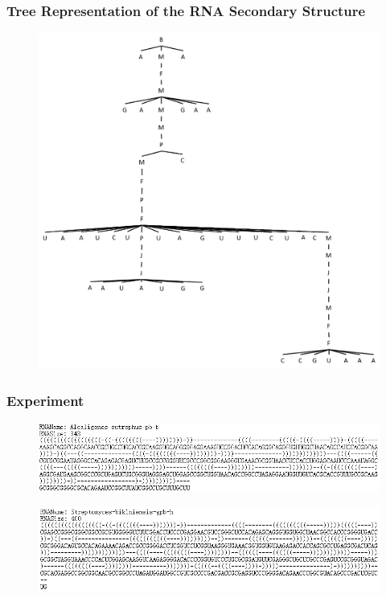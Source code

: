 \documentclass{beamer}
\begin{document}
\begin{frame}
\frametitle{Tree Representation of the RNA Secondary Structure}
\begin{figure}
	\includegraphics[width=0.6\linewidth]{RNAST3}
	\centering
\end{figure}
\end{frame}
\begin{frame}
\frametitle{Experiment}
\begin{figure}
	\includegraphics[width=1.0\linewidth]{AlcaligenesString}
	\centering
\end{figure}
\begin{figure}
	\includegraphics[width=1.0\linewidth]{StreptomycesString}
	\centering
\end{figure}
\end{frame}
\end{document}
